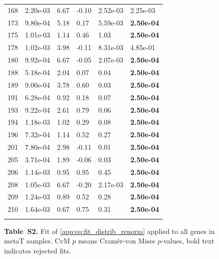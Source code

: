 \begin{figure}[htbp!]
{\begin{minipage}[t]{0.48\linewidth}
\begin{tabular}{llllll}
                    168 & 2.20e-03 & 6.67 & -0.10 & 2.52e-03 & 2.25e-03\\
                    173 & 9.80e-04 & 5.18 & 0.17 & 5.59e-03 & \textbf{2.50e-04}\\
                    175 & 1.01e-03 & 1.14 & 0.46 & 1.03 & \textbf{2.50e-04}\\
                    178 & 1.02e-03 & 3.98 & -0.11 & 8.31e-03 & 4.85e-01\\
                    180 & 9.92e-04 & 6.67 & -0.05 & 2.07e-03 & \textbf{2.50e-04}\\
                    188 & 5.18e-04 & 2.04 & 0.07 & 0.04 & \textbf{2.50e-04}\\
                    189 & 9.00e-04 & 3.78 & 0.60 & 0.03 & \textbf{2.50e-04}\\
                    191 & 6.28e-04 & 0.92 & 0.18 & 0.07 & \textbf{2.50e-04}\\
                    193 & 9.22e-04 & 2.61 & 0.79 & 0.06 & \textbf{2.50e-04}\\
                    194 & 1.18e-03 & 1.02 & 0.29 & 0.08 & \textbf{2.50e-04}\\
                    196 & 7.32e-04 & 1.14 & 0.52 & 0.27 & \textbf{2.50e-04}\\
                    201 & 7.80e-04 & 2.98 & -0.11 & 0.01 & \textbf{2.50e-04}\\
                    205 & 3.71e-04 & 1.89 & -0.06 & 0.03 & \textbf{2.50e-04}\\
                    206 & 1.14e-03 & 0.95 & 0.95 & 0.45 & \textbf{2.50e-04}\\
                    208 & 1.05e-03 & 6.67 & -0.20 & 2.17e-03 & \textbf{2.50e-04}\\
                    209 & 1.24e-03 & 0.89 & 0.52 & 0.28 & \textbf{2.50e-04}\\
                    210 & 1.64e-03 & 0.67 & 0.75 & 0.31 & \textbf{2.50e-04}\\
                     &  &  &  &  & \\
        \bottomrule
        \end{tabular}
    \end{minipage}
    }
    \caption*{\textbf{Table~S2.} Fit of \eqref{app:eq:fit_distrib_renorm} applied to all genes in metaT samples. CvM $p$ means Cram\'er-von Mises $p$-values, bold text indicates rejected fits.}
    \label{subtab:app:all:metaT}
\end{figure}